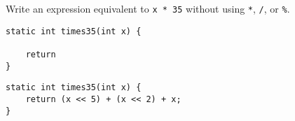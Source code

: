 \question Write an expression equivalent to \texttt{x * 35} without using \texttt{*}, \texttt{/}, or \texttt{\%}.

\ifprintanswers\else
\begin{lstlisting}
static int times35(int x) {

    return
}
\end{lstlisting}
\fi

\begin{solution}
\begin{lstlisting}
static int times35(int x) {
    return (x << 5) + (x << 2) + x;
}
\end{lstlisting}
\end{solution}